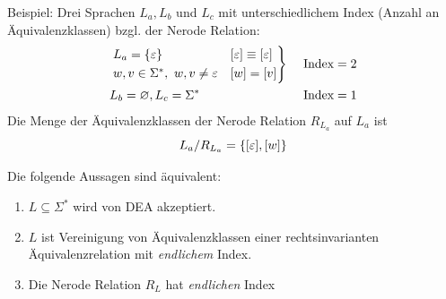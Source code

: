 Beispiel: Drei Sprachen $L_a, L_b$ und $L_c$ mit unterschiedlichem Index  (Anzahl an Äquivalenzklassen) bzgl. der Nerode Relation:
\begin{alignat*}{2}
        &\begin{rcases}
        L_a=\{\varepsilon\} & [\varepsilon]\equiv[\varepsilon]\\
        w,v\in\Sigma^*,\ w,v\ne\varepsilon & [w]=[v]
        \end{rcases} &\ &\text{Index}= 2\\
        &L_b = \varnothing, L_c= \Sigma^* &&\text{Index}= 1
\end{alignat*}
Die Menge der Äquivalenzklassen der Nerode Relation $R_{L_a}$ auf $L_a$ ist
\[ L_a / R_{L_a} = \{ [\varepsilon], [w] \} \]

\begin{Satz}[Nerode] %
        Die folgende Aussagen sind äquivalent:
        \begin{enumerate}
                \item\label{itm:Nerode1} $L\subseteq \Sigma^*$ wird von \ac{DEA} akzeptiert.
                \item\label{itm:Nerode2} $L$ ist Vereinigung von Äquivalenzklassen einer rechtsinvarianten Äquivalenzrelation mit \emph{endlichem} Index.
                \item\label{itm:Nerode3} Die Nerode Relation $R_L$ hat \emph{endlichen} Index
        \end{enumerate}
\end{Satz}

